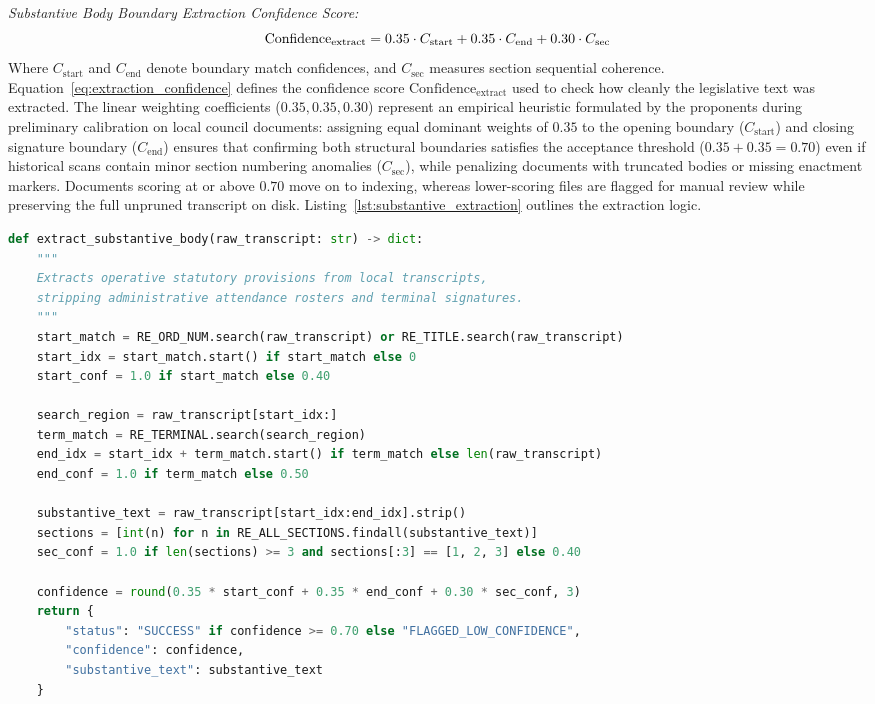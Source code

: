         \noindent\textit{Substantive Body Boundary Extraction Confidence Score:}
        \begin{equation}
            \text{Confidence}_{\text{extract}} = 0.35 \cdot C_{\text{start}} + 0.35 \cdot C_{\text{end}} + 0.30 \cdot C_{\text{sec}}
            \label{eq:extraction_confidence}
            \eqcaption{Substantive Body Boundary Extraction Confidence Score}
        \end{equation}
        \noindent Where $C_{\text{start}}$ and $C_{\text{end}}$ denote boundary match confidences, and $C_{\text{sec}}$ measures section sequential coherence. Equation~\ref{eq:extraction_confidence} defines the confidence score $\text{Confidence}_{\text{extract}}$ used to check how cleanly the legislative text was extracted. The linear weighting coefficients ($0.35, 0.35, 0.30$) represent an empirical heuristic formulated by the proponents during preliminary calibration on local council documents: assigning equal dominant weights of $0.35$ to the opening boundary ($C_{\text{start}}$) and closing signature boundary ($C_{\text{end}}$) ensures that confirming both structural boundaries satisfies the acceptance threshold ($0.35 + 0.35 = 0.70$) even if historical scans contain minor section numbering anomalies ($C_{\text{sec}}$), while penalizing documents with truncated bodies or missing enactment markers. Documents scoring at or above $0.70$ move on to indexing, whereas lower-scoring files are flagged for manual review while preserving the full unpruned transcript on disk. Listing~\ref{lst:substantive_extraction} outlines the extraction logic.

        \begin{lstlisting}[language=Python, caption={Adaptive State Machine for Substantive Legislative Body Extraction}, label={lst:substantive_extraction}]
def extract_substantive_body(raw_transcript: str) -> dict:
    """
    Extracts operative statutory provisions from local transcripts,
    stripping administrative attendance rosters and terminal signatures.
    """
    start_match = RE_ORD_NUM.search(raw_transcript) or RE_TITLE.search(raw_transcript)
    start_idx = start_match.start() if start_match else 0
    start_conf = 1.0 if start_match else 0.40

    search_region = raw_transcript[start_idx:]
    term_match = RE_TERMINAL.search(search_region)
    end_idx = start_idx + term_match.start() if term_match else len(raw_transcript)
    end_conf = 1.0 if term_match else 0.50

    substantive_text = raw_transcript[start_idx:end_idx].strip()
    sections = [int(n) for n in RE_ALL_SECTIONS.findall(substantive_text)]
    sec_conf = 1.0 if len(sections) >= 3 and sections[:3] == [1, 2, 3] else 0.40

    confidence = round(0.35 * start_conf + 0.35 * end_conf + 0.30 * sec_conf, 3)
    return {
        "status": "SUCCESS" if confidence >= 0.70 else "FLAGGED_LOW_CONFIDENCE",
        "confidence": confidence,
        "substantive_text": substantive_text
    }
        \end{lstlisting}

